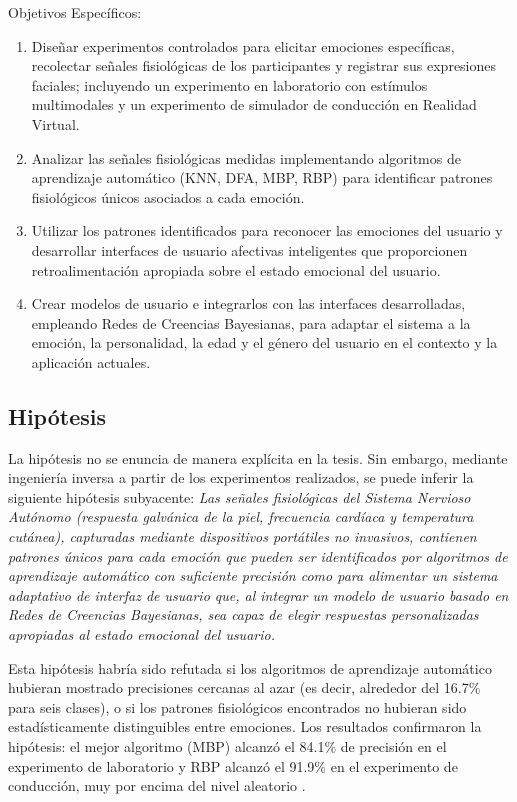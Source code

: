 Objetivos Específicos:
\begin{enumerate}
    \item Diseñar experimentos controlados para elicitar emociones específicas, recolectar señales fisiológicas de los participantes y registrar sus expresiones faciales; incluyendo un experimento en laboratorio con estímulos multimodales y un experimento de simulador de conducción en Realidad Virtual.
    \item Analizar las señales fisiológicas medidas implementando algoritmos de aprendizaje automático (KNN, DFA, MBP, RBP) para identificar patrones fisiológicos únicos asociados a cada emoción.
    \item Utilizar los patrones identificados para reconocer las emociones del usuario y desarrollar interfaces de usuario afectivas inteligentes que proporcionen retroalimentación apropiada sobre el estado emocional del usuario.
    \item Crear modelos de usuario e integrarlos con las interfaces desarrolladas, empleando Redes de Creencias Bayesianas, para adaptar el sistema a la emoción, la personalidad, la edad y el género del usuario en el contexto y la aplicación actuales.
\end{enumerate}

\subsection{Hipótesis}

La hipótesis no se enuncia de manera explícita en la tesis. Sin embargo, mediante ingeniería inversa a partir de los experimentos realizados, se puede inferir la siguiente hipótesis subyacente: \textit{Las señales fisiológicas del Sistema Nervioso Autónomo (respuesta galvánica de la piel, frecuencia cardíaca y temperatura cutánea), capturadas mediante dispositivos portátiles no invasivos, contienen patrones únicos para cada emoción que pueden ser identificados por algoritmos de aprendizaje automático con suficiente precisión como para alimentar un sistema adaptativo de interfaz de usuario que, al integrar un modelo de usuario basado en Redes de Creencias Bayesianas, sea capaz de elegir respuestas personalizadas apropiadas al estado emocional del usuario.}

Esta hipótesis habría sido refutada si los algoritmos de aprendizaje automático hubieran mostrado precisiones cercanas al azar (es decir, alrededor del 16.7\% para seis clases), o si los patrones fisiológicos encontrados no hubieran sido estadísticamente distinguibles entre emociones. Los resultados confirmaron la hipótesis: el mejor algoritmo (MBP) alcanzó el 84.1\% de precisión en el experimento de laboratorio y RBP alcanzó el 91.9\% en el experimento de conducción, muy por encima del nivel aleatorio \cite{nasoz2004}.

